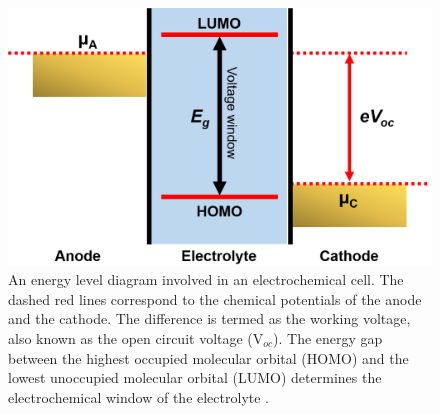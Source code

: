 \begin{figure}[tbh!]
\centering
\includegraphics[width=\textwidth]{Figures/chap1fig/energy}
\caption{An energy level diagram involved in an electrochemical cell. The dashed red lines correspond to the chemical potentials of the anode and the cathode. The difference is termed as the working voltage, also known as the open circuit voltage (V$_{oc}$). The energy gap between the highest occupied molecular orbital (HOMO) and the lowest unoccupied molecular orbital (LUMO) determines the electrochemical window of the electrolyte \cite{liu_understanding_2016}.}
\label{Figures/chap1fig:energy}
\end{figure}

